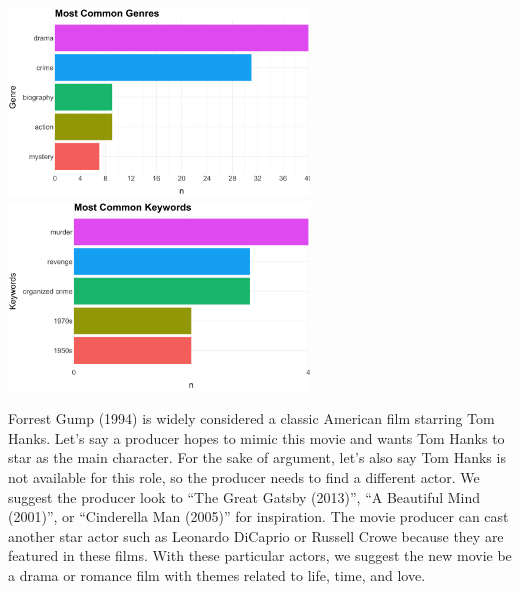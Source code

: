 \documentclass[10pt]{article}
\begin{document}
\begin{center}
\includegraphics[width=8cm]{_assets/_assets_knn/godfather_common_genres.png}
\hspace{1cm}
\includegraphics[width=8cm]{_assets/_assets_knn/godfather_common_keywords.png}

\end{center}

Forrest Gump (1994) is widely considered a classic American film starring Tom Hanks. Let’s say a producer hopes to mimic this movie and wants Tom Hanks to star as the main character. For the sake of argument, let’s also say Tom Hanks is not available for this role, so the producer needs to find a different actor. We suggest the producer look to “The Great Gatsby (2013)”, “A Beautiful Mind (2001)”, or “Cinderella Man (2005)” for inspiration. The movie producer can cast another star actor such as Leonardo DiCaprio or Russell Crowe because they are featured in these films. With these particular actors, we suggest the new movie be a drama or romance film with themes related to life, time, and love.
\end{document}

